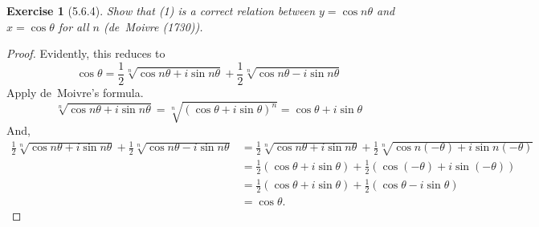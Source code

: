 \documentclass[12pt]{article}
\theoremstyle{plain}
\newtheorem{ex}{Exercise}
\begin{document}
\begin{ex} [5.6.4]
  Show that (1) is a correct relation between $y=\cos n\theta$ and $x=\cos\theta$ for all $n$ (de~Moivre (1730)).
\end{ex}

\begin{proof}
  Evidently, this reduces to
  \[
    \cos\theta=\frac{1}{2}\sqrt[n]{\cos n\theta+i\sin n\theta}+\frac{1}{2}\sqrt[n]{\cos n\theta-i\sin n\theta}
  \]
  Apply de~Moivre's formula.
  \[
    \sqrt[n]{\cos n\theta+i\sin n\theta}=\sqrt[n]{(\cos\theta+i\sin\theta)^n}=\cos\theta+i\sin\theta
  \]
  And,
  \begin{align*}
    \frac{1}{2}\sqrt[n]{\cos n\theta+i\sin n\theta}+\frac{1}{2}\sqrt[n]{\cos n\theta-i\sin n\theta} &= \frac{1}{2}\sqrt[n]{\cos n\theta+i\sin n\theta}+\frac{1}{2}\sqrt[n]{\cos n(-\theta)+i\sin n(-\theta)} \\
      &= \frac{1}{2}(\cos\theta+i\sin\theta)+\frac{1}{2}(\cos(-\theta)+i\sin(-\theta)) \\
      &= \frac{1}{2}(\cos\theta+i\sin\theta)+\frac{1}{2}(\cos\theta-i\sin\theta) \\
      &= \cos\theta.
  \end{align*}
\end{proof}
\end{document}
